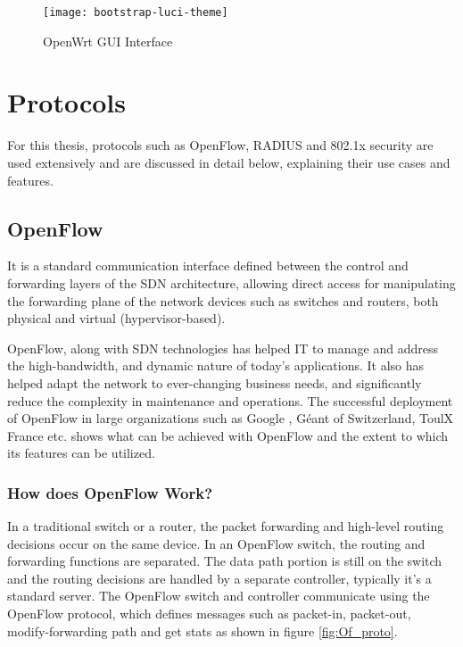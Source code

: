 \begin{figure}
	\centering
	\texttt{[image: bootstrap-luci-theme]}
	\caption{OpenWrt GUI Interface \cite{openwrt_luci_img}} \label{fig:OpenWrt_gui}
	\vspace{-10pt}
\end{figure}
\section{Protocols} \label{protocols}
For this thesis, protocols such as OpenFlow, RADIUS and 802.1x security are used extensively and are discussed in detail below, explaining their use cases and features.
\subsection{OpenFlow \cite{WhatIsOpenFlow}} \label{OpenFlow}

It is a standard communication interface defined between the control and forwarding layers of the SDN architecture, allowing direct access for manipulating the forwarding plane of the network devices such as switches and routers, both physical and virtual (hypervisor-based).

OpenFlow, along with SDN technologies has helped IT to manage and address the high-bandwidth, and dynamic nature of today’s applications. It also has helped adapt the network to ever-changing business needs, and significantly reduce the complexity in maintenance and operations. The successful deployment \cite{of_depl} of OpenFlow in large organizations such as Google \cite{of_google}, Géant of Switzerland, ToulX France etc. shows what can be achieved with OpenFlow and the extent to which its features can be utilized.

%

\subsubsection{How does OpenFlow Work? \cite{OpenFlow_functionality}} \label{OpenFlow_Functionality}
In a traditional switch or a router, the packet forwarding and high-level routing decisions occur on the same device. In an OpenFlow switch, the routing and forwarding functions are separated. The data path portion is still on the switch and the routing decisions are handled by a separate controller, typically it’s a standard server. The OpenFlow switch and controller communicate using the OpenFlow protocol, which defines messages such as packet-in, packet-out, modify-forwarding path and get stats as shown in figure \ref{fig:Of_proto}.
